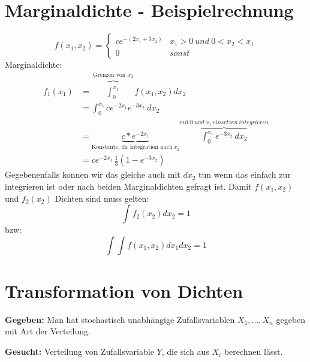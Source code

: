 \documentclass{article}
\begin{document}
\section{Marginaldichte - Beispielrechnung}
\[	
	f(x_1,x_2)=
	\begin{cases}
		ce^{-(2x_1+3x_2)} & x_1  > 0 \: und \: 0 < x_2 <x_1 \\
		0 & sonst
	\end{cases}
\]
Marginaldichte:
\[
	\begin{split}
		f_1(x_1) 	& = \overbrace{\int_{0}^{x_1}}^{\text{Grenzen von }x_2} f(x_1,x_2) dx_2 \\
							  & = \int_{0}^{x_1} ce^{-2x_1}e^{-3x_2} \: dx_2 \\
						   & = \underbrace{c*e^{-2x_1}}_{\text{Konstante, da Integration nach} \: x_2}
		\overbrace{\int_{0}^{x_1} e^{-3x_2} \: dx_2}^{mit \: 0 \: und \: x_1 \: einsetzen \: integrieren} \\
		& = ce^{-2x_1}\, \frac{1}{3} (1-e^{-3x_2} )
	\end{split}
\]
Gegebenenfalls konnen wir das gleiche auch mit $dx_2$ tun wenn das einfach zur integrieren ist oder nach beiden Marginaldichten gefragt ist.
Damit $f(x_1,x_2)$ und $f_2(x_2)$ Dichten sind muss gelten:
\[
	\int f_2(x_2) dx_2 = 1
\]
bzw:
\[
	\int \int f(x_1,x_2) dx_1 dx_2 = 1
\]
\section{Transformation von Dichten}
\begin{center}
\end{center}
\vspace*{7pt}
\textbf{Gegeben:} Man hat stochastisch unabhängige Zufallsvariablen $X_1, \ldots , X_n$ gegeben mit
Art der Verteilung.

\textbf{Gesucht:} Verteilung von Zufallsvariable $Y$, die sich aus $X_i$ berechnen lässt.
\end{document}
